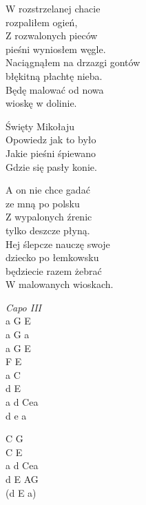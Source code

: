 \begin{text}
    \ifchorded{\hfill\break}
    W rozstrzelanej chacie\\
    rozpaliłem ogień,\\
    Z rozwalonych pieców\\
    pieśni wyniosłem węgle.\\
    Naciągnąłem na drzazgi gontów\\
    błękitną płachtę nieba.\\
    Będę malować od nowa\\
    wioskę w dolinie.

    \vin Święty Mikołaju\\
    \vin Opowiedz jak to było\\
    \vin Jakie pieśni śpiewano\\
    \vin Gdzie się pasły konie.

    A on nie chce gadać\\
    ze mną po polsku\\
    Z wypalonych źrenic\\
    tylko deszcze płyną.\\
    Hej ślepcze nauczę swoje\\
    dziecko po łemkowsku\\
    będziecie razem żebrać\\
    W malowanych wioskach.
\end{text}
\begin{chord}
    \textit{Capo III}\\
    a G E\\
    a G a\\
    a G E\\
    F E\\
    a C\\
    d E\\
    a d Cea\\
    d e a

    C G\\
    C E\\
    a d Cea\\
    d E AG\\
    (d E a)
\end{chord}